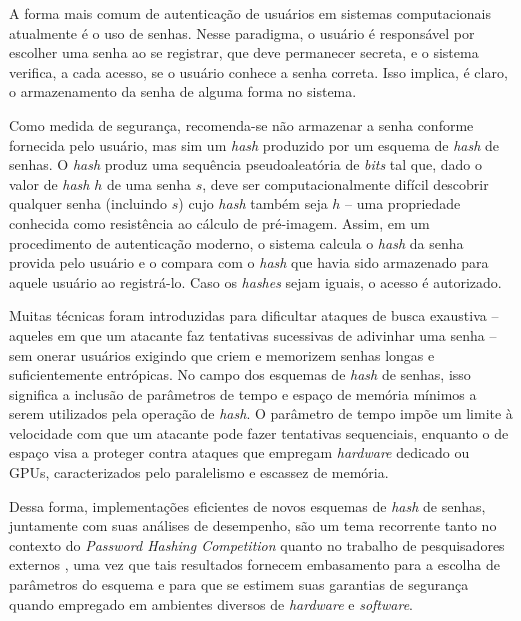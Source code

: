 \documentclass{article}
\begin{document}
A forma mais comum de autenticação de usuários em sistemas
computacionais atualmente é o uso de senhas. Nesse paradigma, o usuário
é responsável por escolher uma senha ao se registrar, que deve
permanecer secreta, e o sistema verifica, a cada acesso, se o usuário
conhece a senha correta. Isso implica, é claro, o armazenamento da senha
de alguma forma no sistema.

Como medida de segurança, recomenda-se não armazenar a senha conforme
fornecida pelo usuário, mas sim um \emph{hash} produzido por um esquema
de \emph{hash} de senhas. O \emph{hash} produz uma sequência pseudoaleatória
de \emph{bits} tal que, dado o valor de \emph{hash} $h$ de uma senha
$s$, deve ser computacionalmente difícil descobrir qualquer senha
(incluindo $s$) cujo \emph{hash} também seja $h$ -- uma propriedade
conhecida como resistência ao cálculo de pré-imagem.
Assim, em um procedimento de autenticação moderno, o sistema calcula o
\emph{hash} da senha provida pelo usuário e o compara com o \emph{hash}
que havia sido armazenado para aquele usuário ao registrá-lo. Caso os
\emph{hashes} sejam iguais, o acesso é autorizado.

Muitas técnicas foram introduzidas para dificultar
ataques de busca exaustiva -- aqueles em que um atacante faz tentativas
sucessivas de adivinhar uma senha -- sem onerar usuários exigindo que
criem e memorizem senhas longas e suficientemente entrópicas.
No campo dos esquemas de \emph{hash} de senhas, isso significa a inclusão
de parâmetros de tempo e espaço de memória mínimos a serem utilizados
pela operação de \emph{hash}. O parâmetro de tempo impõe um limite à
velocidade com que um atacante pode fazer tentativas sequenciais,
enquanto o de espaço visa a proteger contra ataques que empregam \emph{hardware}
dedicado ou GPUs, caracterizados pelo paralelismo e escassez de memória.

Dessa forma, implementações eficientes de novos esquemas de \emph{hash} de
senhas, juntamente com suas análises de desempenho, são um tema recorrente
tanto no contexto do \emph{Password Hashing Competition}
\cite{cryptoeprint:2015:678} quanto no trabalho de pesquisadores externos
\cite{chang2015performance}, uma vez que tais resultados fornecem embasamento
para a escolha de parâmetros do esquema e para que se estimem suas garantias de
segurança quando empregado em ambientes diversos de \emph{hardware} e
\emph{software}.
\end{document}
